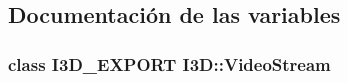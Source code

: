 \subsection{Documentación de las variables}
\subsubsection[{\texorpdfstring{Video\+Stream}{VideoStream}}]{\setlength{\rightskip}{0pt plus 5cm}class I3\+D\+\_\+\+E\+X\+P\+O\+RT {\bf I3\+D\+::\+Video\+Stream}}\hypertarget{namespace_i3_d_a58775d79e6c0d424468e795402091a0a}{}\label{namespace_i3_d_a58775d79e6c0d424468e795402091a0a}
